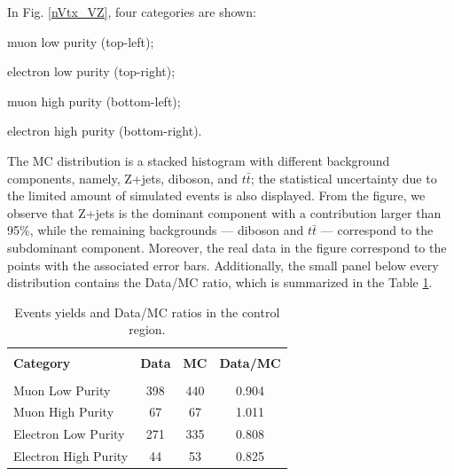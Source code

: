 In Fig. \ref{nVtx_VZ}, four categories are shown: 
\begin{compact_itemize}
\item muon low purity (top-left);
\item electron low purity (top-right);
\item muon high purity (bottom-left);
\item electron high purity (bottom-right).
\end{compact_itemize}

The MC distribution is a stacked histogram with different background components, namely, Z+jets, diboson, and $t\bar{t}$; the statistical uncertainty due to the limited amount of simulated events is also displayed. From the figure, we observe that Z+jets is the dominant component with a contribution larger than 95\%, while the remaining backgrounds --- diboson and $t\bar{t}$ --- correspond to the subdominant component. Moreover, the real data in the figure correspond to the points with the associated error bars. Additionally, the small panel below every distribution contains the Data/MC ratio, which is summarized in the Table \ref{dataMCratio}. 

\vspace{1cm}
\begin{table}[h!]
\begin{center}
\caption[Data/MC ratios]{Events yields and Data/MC ratios in the control region.}
\label{dataMCratio}
\begin{tabular}{lccc}
\hline
&&&\\[-0.2cm]
\textbf{Category}    & \textbf{Data} & \textbf{MC}   &\textbf{Data/MC} \\[0.2cm]
 \hline\hline
 &&&\\[-0.2cm]
Muon Low Purity      & 398           & 440           & 0.904 \\[0.2cm]
Muon High Purity     &  67           & 67            & 1.011 \\[0.2cm]
Electron Low Purity  & 271           & 335           & 0.808 \\[0.2cm]
Electron High Purity &  44           & 53            & 0.825 \\[0.2cm]
\hline
\end{tabular}
\end{center}
\end{table}

